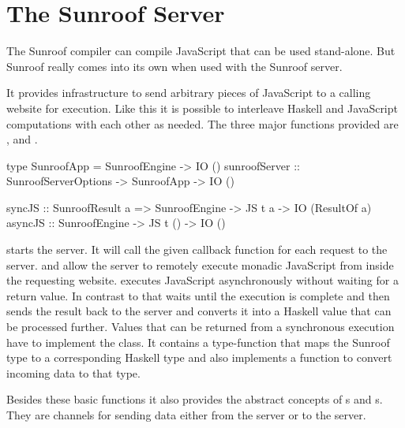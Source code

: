  
\section{The Sunroof Server}
\label{sec:server}

The Sunroof compiler can compile JavaScript that can be used
stand-alone. But Sunroof really comes
into its own when used with the Sunroof server.

It provides infrastructure to send arbitrary pieces 
of JavaScript to a calling website for execution. 
Like this it is possible to interleave Haskell and JavaScript 
computations with each other as needed. The three major functions
provided are ,  and .
\begin{Code}
type SunroofApp = SunroofEngine -> IO ()
sunroofServer :: SunroofServerOptions -> SunroofApp -> IO ()

syncJS  :: SunroofResult a 
        => SunroofEngine -> JS t a -> IO (ResultOf a)
asyncJS :: SunroofEngine -> JS t () -> IO ()
\end{Code}
 starts the server.
It will call the given callback function
for each request to the server.
 and  allow the server
to remotely execute monadic JavaScript from inside the 
requesting website.
 executes JavaScript asynchronously without 
waiting for a return value. In contrast to that 
 waits until the execution is complete and
then sends the result back to the server and converts it 
into a Haskell value that can be processed further. 
Values that can be returned from a synchronous execution 
have to implement the  class. It contains a type-function
 that maps the 
Sunroof type to a corresponding Haskell type and also 
implements a function to convert incoming data to that 
type.

Besides these basic functions it also provides the abstract 
concepts of s and s. They are 
channels for sending data either from the server or to
the server.

